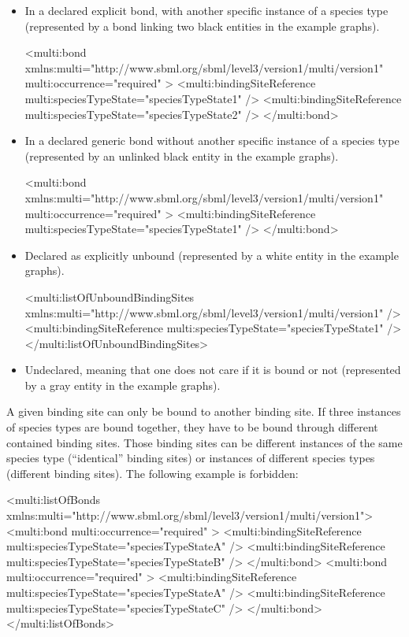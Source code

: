 \begin{itemize}
 \item In a declared explicit bond, with another specific instance of a species type (represented by a bond linking two black entities in the example graphs). 

\begin{example}
<multi:bond xmlns:multi="http://www.sbml.org/sbml/level3/version1/multi/version1" 
            multi:occurrence="required" >
  <multi:bindingSiteReference multi:speciesTypeState="speciesTypeState1" />
  <multi:bindingSiteReference multi:speciesTypeState="speciesTypeState2" />
</multi:bond>
\end{example}

 \item In a declared generic bond without another specific instance of a species type (represented by an unlinked black entity in the example graphs). 

\begin{example}
<multi:bond xmlns:multi="http://www.sbml.org/sbml/level3/version1/multi/version1" 
            multi:occurrence="required" >
  <multi:bindingSiteReference multi:speciesTypeState="speciesTypeState1" />
</multi:bond>
\end{example}

 \item Declared as explicitly unbound (represented by a white entity in the example graphs). 

\begin{example}
<multi:listOfUnboundBindingSites 
             xmlns:multi="http://www.sbml.org/sbml/level3/version1/multi/version1" />
  <multi:bindingSiteReference multi:speciesTypeState="speciesTypeState1" />
</multi:listOfUnboundBindingSites>
\end{example}

\item Undeclared, meaning that one does not care if it is bound or not (represented by a gray entity in the example graphs). 
\end{itemize}

A given binding site can only be bound to another binding site. If three instances of species types are bound together, they have to be bound through different contained binding sites. Those binding sites can be different instances of the same species type (``identical'' binding sites) or instances of different species types (different binding sites). The following example is forbidden:

\color{red}
\begin{example}
<multi:listOfBonds xmlns:multi="http://www.sbml.org/sbml/level3/version1/multi/version1">
  <multi:bond multi:occurrence="required" >
    <multi:bindingSiteReference multi:speciesTypeState="speciesTypeStateA" />
    <multi:bindingSiteReference multi:speciesTypeState="speciesTypeStateB" />
  </multi:bond>
  <multi:bond multi:occurrence="required" >
    <multi:bindingSiteReference multi:speciesTypeState="speciesTypeStateA" />
    <multi:bindingSiteReference multi:speciesTypeState="speciesTypeStateC" />
  </multi:bond>
</multi:listOfBonds>
\end{example}
\normalcolor

